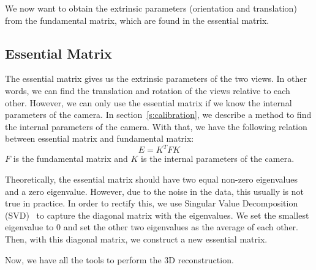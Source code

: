 We now want to obtain the extrinsic parameters (orientation and translation) from the fundamental matrix, which are found in the essential matrix.

\subsection{Essential Matrix}
The essential matrix gives us the extrinsic parameters of the two views. In other words, we can find the translation and rotation of the views relative to each other. However, we can only use the essential matrix if we know the internal parameters of the camera. In section~\ref{s:calibration}, we describe a method to find the internal parameters of the camera. With that, we have the following relation between essential matrix and fundamental matrix:
\begin{equation}
E = K^TFK
\end{equation}
$F$ is the fundamental matrix and $K$ is the internal parameters of the camera.

Theoretically, the essential matrix should have two equal non-zero eigenvalues and a zero eigenvalue. However, due to the noise in the data, this usually is not true in practice. In order to rectify this, we use Singular Value Decomposition (SVD)~\cite{svd} to capture the diagonal matrix with the eigenvalues. We set the smallest eigenvalue to 0 and set the other two eigenvalues as the average of each other. Then, with this diagonal matrix, we construct a new essential matrix.

Now, we have all the tools to perform the 3D reconstruction.
